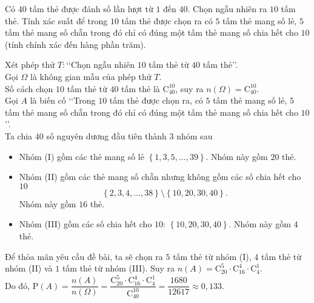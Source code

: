 \begin{bt}%
Có $40$ tấm thẻ được đánh số lần lượt từ $1$ đến $40$. Chọn ngẫu nhiên ra $10$ tấm thẻ. Tính xác suất để trong $10$ tấm thẻ được chọn ra có $5$ tấm thẻ mang số lẻ, $5$ tấm thẻ mang số chẵn trong đó chỉ có đúng một tấm thẻ mang số chia hết cho $10$ (tính chính xác đến hàng phần trăm).
\loigiai
{
Xét phép thử $T\colon$\lq\lq Chọn ngẫu nhiên $10$ tấm thẻ từ $40$ tấm thẻ\rq\rq. \\
Gọi $\Omega$ là không gian mẫu của phép thử $T$. \\
Số cách chọn $10$ tấm thẻ từ $40$ tấm thẻ là $\mathrm{C}_{40}^{10}$, suy ra $n\left(\Omega\right) = \mathrm{C}_{40}^{10}$.\\
Gọi $A$ là biến cố \lq\lq Trong $10$ tấm thẻ được chọn ra, có $5$ tấm thẻ mang số lẻ, $5$ tấm thẻ mang số chẵn trong đó chỉ có đúng một tấm thẻ mang số chia hết cho $10$\rq\rq.\\
Ta chia $40$ số nguyên dương đầu tiên thành $3$ nhóm sau
\begin{itemize}
\item Nhóm (I) gồm các thẻ mang số lẻ $\left\{1,3,5,\dots,39\right\}$. Nhóm này gồm $20$ thẻ.
\item Nhóm (II) gồm các thẻ mang số chẵn nhưng không gồm các số chia hết cho $10$
$$\left\{2,3,4,\dots,38\right\}\setminus\left\{10,20,30,40\right\}.$$
Nhóm này gồm $16$ thẻ.
\item Nhóm (III) gồm các số chia hết cho $10$: $\left\{10,20,30,40\right\}$. Nhóm này gồm $4$ thẻ.
\end{itemize}
Để thỏa mãn yêu cầu đề bài, ta sẽ chọn ra $5$ tấm thẻ từ nhóm (I), $4$ tấm thẻ từ nhóm (II) và $1$ tấm thẻ từ nhóm (III). Suy ra $n(A) = \mathrm{C}_{20}^{5}\cdot\mathrm{C}_{16}^{4}\cdot\mathrm{C}_{4}^{1}$.\\
Do đó, $\mathrm{P}\left(A\right) = \dfrac{n\left(A\right)}{n\left( \Omega\right)} = \dfrac{\mathrm{C}_{20}^{5}\cdot\mathrm{C}_{16}^{4}\cdot\mathrm{C}_{4}^{1}}{\mathrm{C}_{40}^{10}} = \dfrac{1680}{12617} \approx 0{,}133$.
}
\end{bt}


